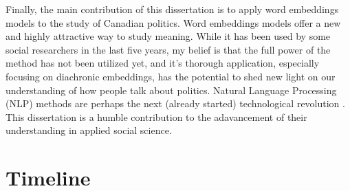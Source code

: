 \documentclass[
  openany]{book}
\begin{document}
Finally, the main contribution of this dissertation is to apply word embeddings models to the study of Canadian politics. Word embeddings models offer a new and highly attractive way to study meaning. While it has been used by some social researchers in the last five years, my belief is that the full power of the method has not been utilized yet, and it's thorough application, especially focusing on diachronic embeddings, has the potential to shed new light on our understanding of how people talk about politics. Natural Language Processing (NLP) methods are perhaps the next (already started) technological revolution \citep{floridi2020gpt, lakhotia2021generative}. This dissertation is a humble contribution to the adavancement of their understanding in applied social science.

\hypertarget{timeline}{%
\chapter{Timeline}\label{timeline}}

\providecommand{\docline}[3]{\noalign{\global\setlength{\arrayrulewidth}{#1}}\arrayrulecolor[HTML]{#2}\cline{#3}}

\setlength{\tabcolsep}{2pt}

\renewcommand*{\arraystretch}{1.5}
\end{document}
